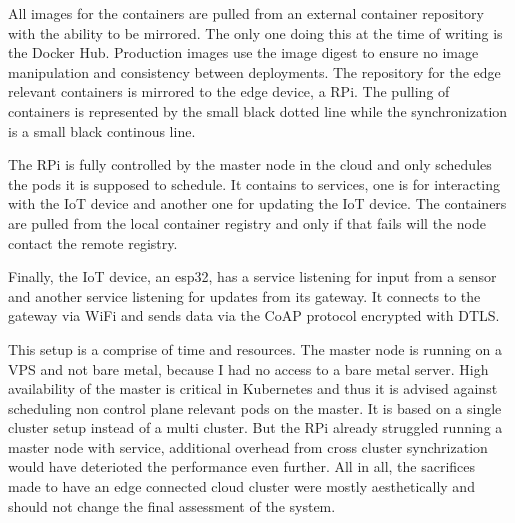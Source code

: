 All images for the containers are pulled from an external container repository with the ability to be mirrored. The only one doing this at the time of writing is the Docker Hub. Production images use the image digest to ensure no image manipulation and consistency between deployments. The repository for the edge relevant containers is mirrored to the edge device, a RPi. The pulling of containers is represented by the small black dotted line while the synchronization is a small black continous line.

The RPi is fully controlled by the master node in the cloud and only schedules the pods it is supposed to schedule. It contains to services, one is for interacting with the IoT device and another one for updating the IoT device. The containers are pulled from the local container registry and only if that fails will the node contact the remote registry. 

Finally, the IoT device, an esp32, has a service listening for input from a sensor and another service listening for updates from its gateway. It connects to the gateway via WiFi and sends data via the CoAP protocol encrypted with DTLS.

This setup is a comprise of time and resources. The master node is running on a VPS and not bare metal, because I had no access to a bare metal server. High availability of the master is critical in Kubernetes and thus it is advised against scheduling non control plane relevant pods on the master. It is based on a single cluster setup instead of a multi cluster. 
But the RPi already struggled running a master node with service, additional overhead from cross cluster synchrization would have deterioted the performance even further. All in all, the sacrifices made to have an edge connected cloud cluster were mostly aesthetically and should not change the final assessment of the system.

